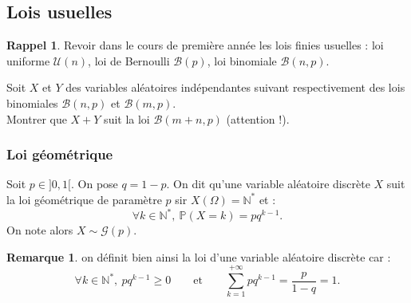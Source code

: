 \documentclass[french]{article}
\renewcommand{\P}{\mathbb{P}}
\newcommand{\N}{\mathbb{N}}
\newcommand{\st}{^*}
\theoremstyle{plain}
\theoremstyle{definition}
\newtheorem*{rmq}{Remarque}
\newtheorem*{rappel}{Rappel}
\theoremstyle{remark}
\begin{document}
\subsection{Lois usuelles}

\begin{rappel}
	Revoir dans le cours de première année les lois finies usuelles : loi uniforme $\mathcal{U}(n)$, loi de Bernoulli $\mathcal{B}(p)$, loi binomiale $\mathcal{B}(n,p)$.
\end{rappel}

\begin{exo}
	Soit $X$ et $Y$ des variables aléatoires indépendantes suivant respectivement des lois binomiales $\mathcal{B}(n,p)$ et $\mathcal{B}(m,p)$.\\
	Montrer que $X+Y$ suit la loi $\mathcal{B}(m+n,p)$ (attention !).
\end{exo}

\subsubsection*{Loi géométrique}

\begin{dfn}
	Soit $p\in]0,1[$. On pose $q=1-p$. On dit qu'une variable aléatoire discrète $X$ suit la loi géométrique de paramètre $p$ sir $X(\Omega)=\N\st$ et :
	$$\forall k\in\N\st,\ \P(X=k)=pq^{k-1}.$$
	On note alors $X\sim\mathcal{G}(p)$.
\end{dfn}

\begin{rmq}
	on définit bien ainsi la loi d'une variable aléatoire discrète car :
	$$\forall k\in\N\st,\ pq^{k-1}\geqslant0\quad\quad\text{et}\quad\quad\sum_{k=1}^{+\infty}pq^{k-1}=\frac{p}{1-q}=1.$$
\end{rmq}
\end{document}
